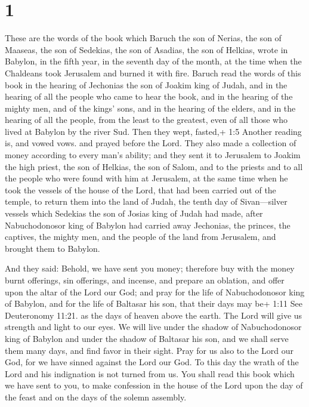 \hypertarget{section}{%
\section{1}\label{section}}

 These are the words of the book which Baruch the son of
Nerias, the son of Maaseas, the son of Sedekias, the son of Asadias, the
son of Helkias, wrote in Babylon,  in the fifth year, in the
seventh day of the month, at the time when the Chaldeans took Jerusalem
and burned it with fire.  Baruch read the words of this book
in the hearing of Jechonias the son of Joakim king of Judah, and in the
hearing of all the people who came to hear the book,  and in
the hearing of the mighty men, and of the kings' sons, and in the
hearing of the elders, and in the hearing of all the people, from the
least to the greatest, even of all those who lived at Babylon by the
river Sud.  Then they wept, fasted,+ 1:5 Another reading is,
and vowed vows. and prayed before the Lord.  They also made
a collection of money according to every man's ability;  and
they sent it to Jerusalem to Joakim the high priest, the son of Helkias,
the son of Salom, and to the priests and to all the people who were
found with him at Jerusalem,  at the same time when he took
the vessels of the house of the Lord, that had been carried out of the
temple, to return them into the land of Judah, the tenth day of
Sivan---silver vessels which Sedekias the son of Josias king of Judah
had made,  after Nabuchodonosor king of Babylon had carried
away Jechonias, the princes, the captives, the mighty men, and the
people of the land from Jerusalem, and brought them to Babylon.

 And they said: Behold, we have sent you money; therefore
buy with the money burnt offerings, sin offerings, and incense, and
prepare an oblation, and offer upon the altar of the Lord our God;
 and pray for the life of Nabuchodonosor king of Babylon,
and for the life of Baltasar his son, that their days may be+ 1:11 See
Deuteronomy 11:21. as the days of heaven above the earth. 
The Lord will give us strength and light to our eyes. We will live under
the shadow of Nabuchodonosor king of Babylon and under the shadow of
Baltasar his son, and we shall serve them many days, and find favor in
their sight.  Pray for us also to the Lord our God, for we
have sinned against the Lord our God. To this day the wrath of the Lord
and his indignation is not turned from us.  You shall read
this book which we have sent to you, to make confession in the house of
the Lord upon the day of the feast and on the days of the solemn
assembly.

